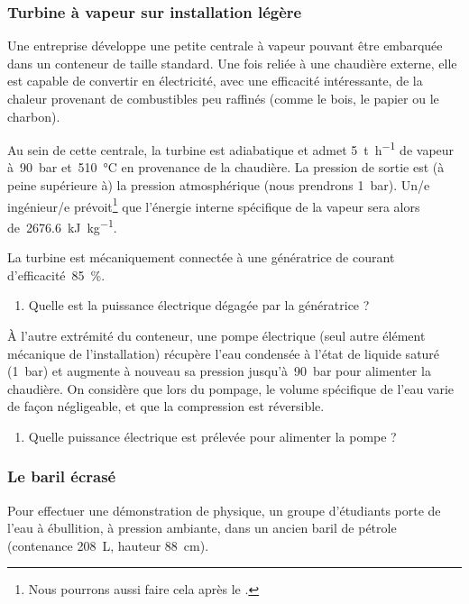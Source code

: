 \subsubsection{Turbine à vapeur sur installation légère}
\label{exo_turbine_vapeur_legere}

	Une entreprise développe une petite centrale à vapeur pouvant être embarquée dans un conteneur de taille standard. Une fois reliée à une chaudière externe, elle est capable de convertir en électricité, avec une efficacité intéressante, de la chaleur provenant de combustibles peu raffinés (comme le bois, le papier ou le charbon).
	
	Au sein de cette centrale, la turbine est adiabatique et admet \SI{5}{\tonne\per\hour} de vapeur à~\SI{90}{\bar} et~\SI{510}{\degreeCelsius} en provenance de la chaudière. La pression de sortie est (à peine supérieure à) la pression atmosphérique (nous prendrons \SI{1}{\bar}). Un/e ingénieur/e prévoit\footnote{Nous pourrons aussi faire cela après le \courshuit.} que l’énergie interne spécifique de la vapeur sera alors de~\SI{2676,6}{\kilo\joule\per\kilogram}.
	
	La turbine est mécaniquement connectée à une génératrice de courant d’efficacité~\SI{85}{\percent}.
	
	\begin{enumerate}
		\item Quelle est la puissance électrique dégagée par la génératrice ?
	\end{enumerate}
	
	À l’autre extrémité du conteneur, une pompe électrique (seul autre élément mécanique de l’installation) récupère l’eau condensée à l’état de liquide saturé (\SI{1}{\bar}) et augmente à nouveau sa pression jusqu’à~\SI{90}{\bar} pour alimenter la chaudière. On considère que lors du pompage, le volume spécifique de l’eau varie de façon négligeable, et que la compression est réversible.
	
	\begin{enumerate}
		\item Quelle puissance électrique est prélevée pour alimenter la pompe ?
	\end{enumerate}
	



\subsubsection{Le baril écrasé}
\label{exo_baril}

	Pour effectuer une démonstration de physique, un groupe d’étudiants porte de l’eau à ébullition, à pression ambiante, dans un ancien baril de pétrole (contenance \SI{208}{\liter}, hauteur \SI{88}{\centi\metre}).
	
